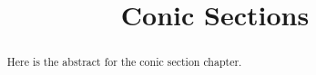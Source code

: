 \documentclass{ximera}
\title{Conic Sections}
\begin{document}
	\begin{abstract}
		Here is the abstract for the conic section chapter.
	\end{abstract}
	\maketitle
\end{document}
